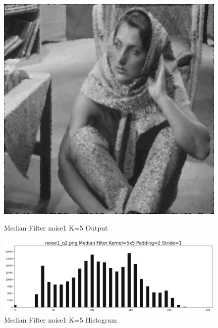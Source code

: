 \documentclass[12pt,a4paper]{report}
\begin{document}
\begin{figure}[!htb]
  \includegraphics[width=1\linewidth]{output/noise1_q2_K5P2.png}
  \caption{Median Filter noise1 K=5 Output}
  \includegraphics[width=1\linewidth]{output/noise1_q2_K5P2_his.png}
  \caption{Median Filter noise1 K=5 Histogram}
\end{figure}
\end{document}

